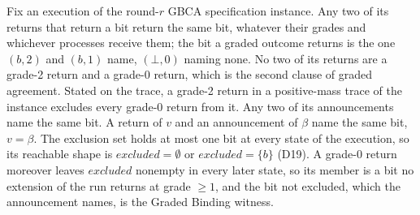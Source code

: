 \begin{theorem}
  \label{thm:gbca-spec-binding}
  \leanok
  Fix an execution of the round-$r$ GBCA specification instance.
  Any two of its returns that return a bit return the same bit, whatever their grades and whichever processes receive them; the bit a graded outcome returns is the one $(b,2)$ and $(b,1)$ name, $(\bot,0)$ naming none.\leanok{} No two of its returns are a grade-2 return and a grade-0 return, which is the second clause of graded agreement.\leanok{} Stated on the trace, a grade-2 return in a positive-mass trace of the instance excludes every grade-0 return from it.\leanok{} Any two of its announcements name the same bit.\leanok{} A return of $v$ and an announcement of $\beta$ name the same bit, $v = \beta$.\leanok{} The exclusion set holds at most one bit at every state of the execution, so its reachable shape is $excluded = \emptyset$ or $excluded = \{b\}$ (D19).\leanok{} A grade-0 return moreover leaves $excluded$ nonempty in every later state, so its member is a bit no extension of the run returns at grade $\ge 1$, and the bit not excluded, which the announcement names, is the Graded Binding witness.\leanok{}
\end{theorem}

